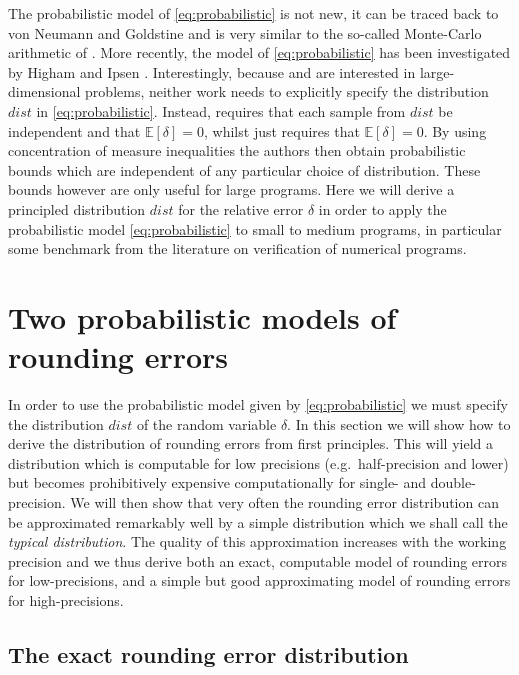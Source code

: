\documentclass[10pt,conference]{IEEEtran}
\newcommand{\eg}{e.g.\ }
\newcommand{\Exp}[1]{\mathbb{E}\left[#1\right]}
\begin{document}
The probabilistic model of \cref{eq:probabilistic} is not new, it can be traced back to von Neumann and Goldstine \cite{von1947numerical} and is very similar to the so-called Monte-Carlo arithmetic of \cite{parker1997monte}. More recently, the model of \cref{eq:probabilistic} has been investigated by Higham \cite{higham2019new}
and Ipsen \cite{ipsen2019probabilistic}. Interestingly, because \cite{higham2019new} and \cite{ipsen2019probabilistic} are interested in large-dimensional problems, neither work needs to explicitly specify the distribution $dist$ in \cref{eq:probabilistic}. Instead, \cite{higham2019new} requires that each sample from $dist$ be independent and that $\Exp{\delta}=0$, whilst \cite{ipsen2019probabilistic} just requires that $\Exp{\delta}=0$. By using concentration of measure inequalities the authors then obtain probabilistic bounds which are independent of any particular choice of distribution. 
These bounds however are only useful for large programs. Here we will derive a principled distribution $dist$ for the relative error $\delta$ in order to apply the probabilistic model \cref{eq:probabilistic} to small to medium programs, in particular some benchmark from the literature on verification of numerical programs.

\section{Two probabilistic models of rounding errors}

In order to use the probabilistic model given by \cref{eq:probabilistic} we must specify the distribution $dist$ of the random variable $\delta$. In this section we will show how to derive the distribution of rounding errors from first principles. This will yield a distribution which is computable for low precisions (\eg half-precision and lower) but becomes prohibitively expensive computationally for single- and double-precision. We will then show that very often the rounding error distribution can be approximated remarkably well by a simple distribution which we shall call the \emph{typical distribution}. The quality of this approximation increases with the working precision and we thus derive both an exact, computable model of rounding errors for low-precisions, and a simple but good approximating model of rounding errors for high-precisions.

\subsection{The exact rounding error distribution}\label{subsec:error_dist}
\end{document}
